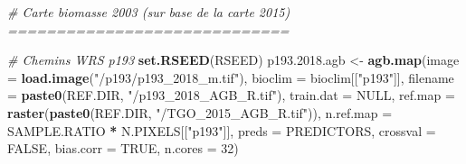 \documentclass[a4paper, notitlepage, 12pt, krantz2]{krantz}
\newenvironment{Shaded}{\begin{snugshade}}{\end{snugshade}}
\newcommand{\CommentTok}[1]{\textcolor[rgb]{0.56,0.35,0.01}{\textit{#1}}}
\newcommand{\DataTypeTok}[1]{\textcolor[rgb]{0.13,0.29,0.53}{#1}}
\newcommand{\DecValTok}[1]{\textcolor[rgb]{0.00,0.00,0.81}{#1}}
\newcommand{\FloatTok}[1]{\textcolor[rgb]{0.00,0.00,0.81}{#1}}
\newcommand{\KeywordTok}[1]{\textcolor[rgb]{0.13,0.29,0.53}{\textbf{#1}}}
\newcommand{\NormalTok}[1]{#1}
\newcommand{\OperatorTok}[1]{\textcolor[rgb]{0.81,0.36,0.00}{\textbf{#1}}}
\newcommand{\OtherTok}[1]{\textcolor[rgb]{0.56,0.35,0.01}{#1}}
\newcommand{\StringTok}[1]{\textcolor[rgb]{0.31,0.60,0.02}{#1}}
\begin{document}
\begin{Shaded}
\begin{Highlighting}[]
{{{{\CommentTok{# Carte biomasse 2003 (sur base de la carte 2015) =============================}

\CommentTok{# Chemins WRS p193}
\KeywordTok{set.RSEED}\NormalTok{(RSEED)}
\NormalTok{p193.}\FloatTok{2018.}\NormalTok{agb <-}\StringTok{ }\KeywordTok{agb.map}\NormalTok{(}\DataTypeTok{image     =} \KeywordTok{load.image}\NormalTok{(}\StringTok{"/p193/p193_2018_m.tif"}\NormalTok{), }
                         \DataTypeTok{bioclim   =}\NormalTok{ bioclim[[}\StringTok{"p193"}\NormalTok{]],}
                         \DataTypeTok{filename  =} \KeywordTok{paste0}\NormalTok{(REF.DIR, }\StringTok{"/p193_2018_AGB_R.tif"}\NormalTok{),}
                         \DataTypeTok{train.dat =} \OtherTok{NULL}\NormalTok{,}
                         \DataTypeTok{ref.map   =} \KeywordTok{raster}\NormalTok{(}\KeywordTok{paste0}\NormalTok{(REF.DIR, }\StringTok{"/TGO_2015_AGB_R.tif"}\NormalTok{)),}
                         \DataTypeTok{n.ref.map =}\NormalTok{ SAMPLE.RATIO }\OperatorTok{*}\StringTok{ }\NormalTok{N.PIXELS[[}\StringTok{"p193"}\NormalTok{]],}
                         \DataTypeTok{preds     =}\NormalTok{ PREDICTORS,}
                         \DataTypeTok{crossval  =} \OtherTok{FALSE}\NormalTok{,}
                         \DataTypeTok{bias.corr =} \OtherTok{TRUE}\NormalTok{,}
                         \DataTypeTok{n.cores   =} \DecValTok{32}\NormalTok{)}

}}}}
\end{Highlighting}
\end{Shaded}
\end{document}
